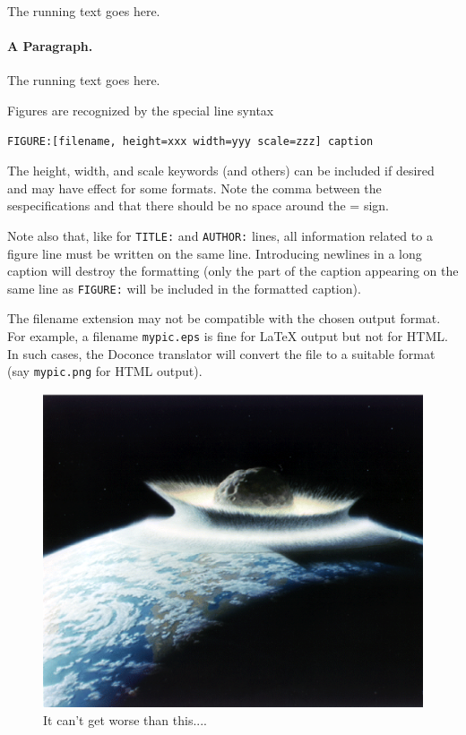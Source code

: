 \documentclass{article}
\begin{document}
The running text goes here.

\paragraph{A Paragraph.}
The running text goes here.

Figures are recognized by the special line syntax
\begin{Verbatim}[fontsize=\fontsize{9pt}{9pt},tabsize=8,baselinestretch=0.85,
fontfamily=tt,xleftmargin=7mm]
FIGURE:[filename, height=xxx width=yyy scale=zzz] caption
\end{Verbatim}
\noindent
The height, width, and scale keywords (and others) can be included
if desired and may have effect for some formats. Note the comma
between the sespecifications and that there should be no space
around the = sign.

Note also that, like for {\fontsize{10pt}{10pt}\verb!TITLE:!} and {\fontsize{10pt}{10pt}\verb!AUTHOR:!} lines, all information
related to a figure line must be written on the same line. Introducing
newlines in a long caption will destroy the formatting (only the
part of the caption appearing on the same line as {\fontsize{10pt}{10pt}\verb!FIGURE:!} will be
included in the formatted caption).

The filename extension may not be compatible with the chosen output format.
For example, a filename {\fontsize{10pt}{10pt}\verb!mypic.eps!} is fine for {\LaTeX} output but not for
HTML. In such cases, the Doconce translator will convert the file to
a suitable format (say {\fontsize{10pt}{10pt}\verb!mypic.png!} for HTML output).


\begin{figure}
  \centerline{\includegraphics[width=\linewidth]{figs/dinoimpact.ps}}
  \caption{
  It can't get worse than this.... \label{fig:impact}
  \label{fig:dinoimpact}  %
  }
\end{figure}
\end{document}

